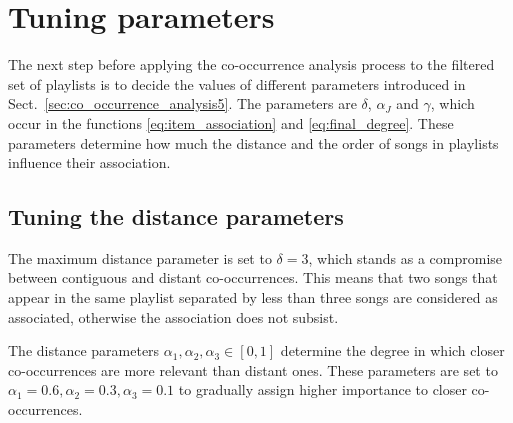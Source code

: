 % 
% 
% 

\section{Tuning parameters} %
\label{sub:tuning_parameters}

The next step before applying the co-occurrence analysis process to the filtered set of playlists is to decide the values of different parameters introduced in Sect.~\ref{sec:co_occurrence_analysis5}.
The parameters are $\delta$, $\alpha_J$ and $\gamma$, which occur in the functions \eqref{eq:item_association} and \eqref{eq:final_degree}.
These parameters determine how much the distance and the order of songs in playlists influence their association.

\subsection{Tuning the distance parameters} %
\label{par:considering_separated_songs_}

The maximum distance parameter is set to $\delta = 3$, which stands as a compromise between contiguous and distant co-occurrences.
This means that two songs that appear in the same playlist separated by less than three songs are considered as associated, otherwise the association does not subsist.


The distance parameters $\alpha_1, \alpha_2, \alpha_3 \in [0,1]$ determine the degree in which closer co-occurrences are more relevant than distant ones.
These parameters are set to $\alpha_1 = 0.6, \alpha_2 = 0.3, \alpha_3 = 0.1$ to gradually assign higher importance to closer co-occurrences.

